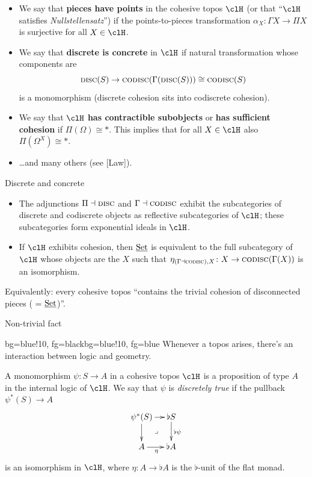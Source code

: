 \documentclass[presentation]{beamer}
\begin{document}
%
%
%
%
%
%
%
\begin{frame}
	\begin{itemize}
		\item<+-> We say that \textbf{pieces have points} in the cohesive topos $\clH$ (or that ``$\clH$ satisfies \emph{Nullstellensatz}'') if the points-to-pieces transformation $\alpha_X\colon \Gamma X \to \Pi X$ is surjective for all $X\in\clH$.
		\item<+-> We say that \textbf{discrete is concrete} in $\clH$ if natural transformation whose components are
		      \[
			      \textsc{disc}(S) \to \textsc{codisc}(\Gamma(\textsc{disc}(S))) \cong \textsc{codisc}(S)
		      \]
		      is a monomorphism (discrete cohesion sits into codiscrete cohesion).
		\item<+-> We say that $\clH$ \textbf{has contractible subobjects} or \textbf{has sufficient cohesion} if $\Pi(\Omega)\cong *$. This implies that for all $X\in\clH$ also $\Pi(\Omega^X)\cong *$.

		      \vspace*{\fill}
		\item<+-> \dots and many others (see [Law]).
	\end{itemize}
\end{frame}
%
%
%
%
%
%
%
\begin{frame}{Discrete and concrete}
	\begin{prop}
		\begin{itemize}
			\item The adjunctions $\Pi\dashv\textsc{disc}$ and $\Gamma\dashv\textsc{codisc}$ exhibit the subcategories of discrete and codiscrete objects as reflective subcategories of $\clH$; these subcategories form \alert{exponential ideals} in $\clH$.
			\item If $\clH$ exhibits cohesion, then $\underline{\text{Set}}$ is equivalent to the full subcategory of $\clH$ whose objects are the $X$ such that $\eta_{(\Gamma\dashv\textsc{codisc}),X}\colon X\to \textsc{codisc}(\Gamma(X))$ is an isomorphism.
		\end{itemize}
	\end{prop}
	Equivalently: every cohesive topos ``contains the trivial cohesion of disconnected pieces ( = $\underline{\text{Set}}$)''.
\end{frame}
%
%
%
%
%
%
%
\begin{frame}{Non-trivial fact}
	\begin{variableblock}{}{bg=blue!10, fg=black}{bg=blue!10, fg=blue}
		Whenever a topos arises, there's an interaction between logic and geometry.
	\end{variableblock}
	\onslide<+->
	\small
	\begin{df}
		A monomorphism $\psi\colon S\to A$ in a cohesive topos $\clH$ is a proposition of type $A$ in the internal logic of $\clH$. We say that $\psi$ is \emph{discretely true} if the pullback $\psi^*(S) \to A$
		\[
			\xymatrix@!=4mm{
			\psi^*(S) \ar[r]\ar[d]\ar@{}[dr]|\lrcorner & \flat S \ar[d]^{\flat\psi} \\
			A \ar[r]_\eta & \flat A
			}
		\]
		is an isomorphism in $\clH$, where $\eta : A\to \flat A$ is the $\flat$-unit of the flat monad.
	\end{df}
\end{frame}
\end{document}
